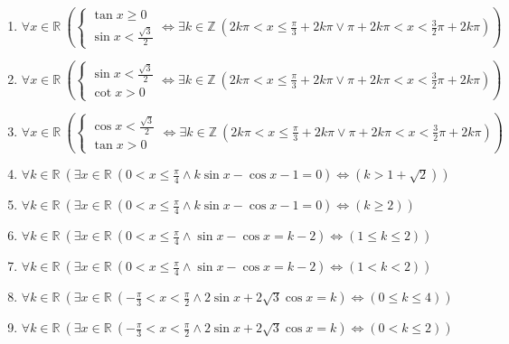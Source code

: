 \documentclass[11pt,a4paper]{article}
\begin{document}
\begin{enumerate}
\item $\displaystyle \forall x \in \mathbb{R}\ \left( \begin{cases} \tan x \ge 0 \\ \sin x < \frac{\sqrt{3}}{2} \end{cases} \iff \exists k \in \mathbb{Z}\ \left( 2k\pi < x \le \frac{\pi}{3} + 2k\pi \lor \pi + 2k\pi < x < \frac{3}{2}\pi + 2k\pi \right) \right)$
\item $\displaystyle \forall x \in \mathbb{R}\ \left( \begin{cases} \sin x < \frac{\sqrt{3}}{2} \\ \cot x > 0 \end{cases} \iff \exists k \in \mathbb{Z}\ \left( 2k\pi < x \le \frac{\pi}{3} + 2k\pi \lor \pi + 2k\pi < x < \frac{3}{2}\pi + 2k\pi \right) \right)$
\item $\displaystyle \forall x \in \mathbb{R}\ \left( \begin{cases} \cos x < \frac{\sqrt{3}}{2} \\ \tan x > 0 \end{cases} \iff \exists k \in \mathbb{Z}\ \left( 2k\pi < x \le \frac{\pi}{3} + 2k\pi \lor \pi + 2k\pi < x < \frac{3}{2}\pi + 2k\pi \right) \right)$
\item $\displaystyle \forall k \in \mathbb{R}\ \left( \exists x \in \mathbb{R}\ \left( 0 < x \le \frac{\pi}{4} \land k\sin x - \cos x - 1 = 0 \right) \iff \left( k > 1 + \sqrt{2} \right) \right)$
\item $\displaystyle \forall k \in \mathbb{R}\ \left( \exists x \in \mathbb{R}\ \left( 0 < x \le \frac{\pi}{4} \land k\sin x - \cos x - 1 = 0 \right) \iff \left( k \ge 2 \right) \right)$
\item $\displaystyle \forall k \in \mathbb{R}\ \left( \exists x \in \mathbb{R}\ \left( 0 < x \le \frac{\pi}{4} \land \sin x - \cos x = k - 2 \right) \iff \left( 1 \le k \le 2 \right) \right)$
\item $\displaystyle \forall k \in \mathbb{R}\ \left( \exists x \in \mathbb{R}\ \left( 0 < x \le \frac{\pi}{4} \land \sin x - \cos x = k - 2 \right) \iff \left( 1 < k < 2 \right) \right)$
\item $\displaystyle \forall k \in \mathbb{R}\ \left( \exists x \in \mathbb{R}\ \left( -\frac{\pi}{3} < x < \frac{\pi}{2} \land 2\sin x + 2\sqrt{3}\cos x = k \right) \iff \left( 0 \le k \le 4 \right) \right)$
\item $\displaystyle \forall k \in \mathbb{R}\ \left( \exists x \in \mathbb{R}\ \left( -\frac{\pi}{3} < x < \frac{\pi}{2} \land 2\sin x + 2\sqrt{3}\cos x = k \right) \iff \left( 0 < k \le 2 \right) \right)$

\end{enumerate}
\end{document}
